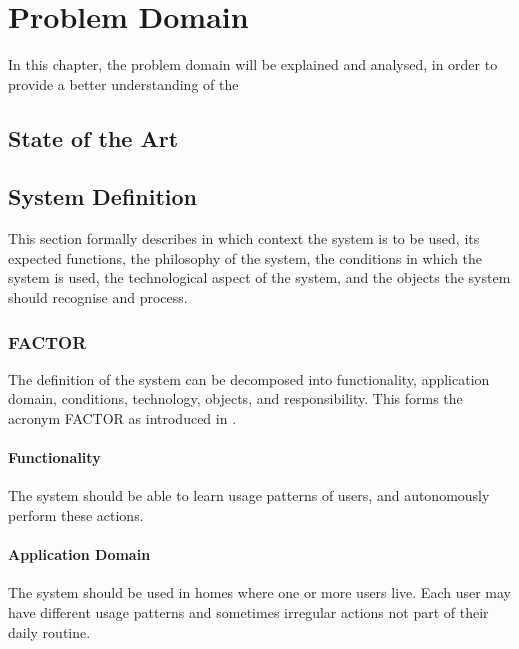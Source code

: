 \chapter{Problem Domain}\label{part:analysis}

In this chapter, the problem domain will be explained and analysed, in order to provide a better understanding of the 

\section{State of the Art}






\section{System Definition}

This section formally describes in which context the system is to be used, its
expected functions, the philosophy of the system, the conditions in which the
system is used, the technological aspect of the system, and the objects the
system should recognise and process.

\subsection{FACTOR}

The definition of the system can be decomposed into functionality, application
domain, conditions, technology, objects, and responsibility. This forms the
acronym FACTOR as introduced in \cite{mathiassen2001objektorienteret}.

\subsubsection{Functionality}

The system should be able to learn usage patterns of users, and autonomously
perform these actions.

\subsubsection{Application Domain}

The system should be used in homes where one or more users live. Each user may
have different usage patterns and sometimes irregular actions not part of their
daily routine.

